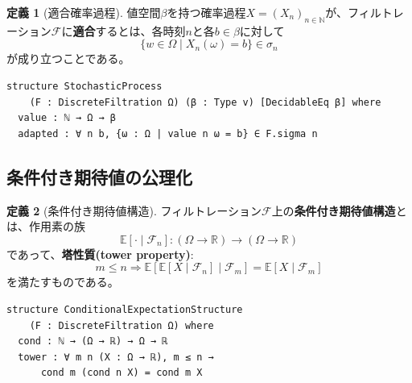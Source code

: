 \documentclass[a4paper,12pt]{ltjsarticle}
\theoremstyle{definition}
\newtheorem{definition}{定義}[section]
\begin{document}
\begin{definition}[適合確率過程]
値空間$\beta$を持つ確率過程$X = (X_n)_{n \in \mathbb{N}}$が、フィルトレーション$\mathcal{F}$に\textbf{適合}するとは、各時刻$n$と各$b \in \beta$に対して
\[
  \{w \in \Omega \mid X_n(\omega) = b\} \in \sigma_n
\]
が成り立つことである。
\end{definition}

\begin{leanbox}
\begin{verbatim}
structure StochasticProcess
    (F : DiscreteFiltration Ω) (β : Type v) [DecidableEq β] where
  value : ℕ → Ω → β
  adapted : ∀ n b, {ω : Ω | value n ω = b} ∈ F.sigma n
\end{verbatim}
\end{leanbox}

\subsection{条件付き期待値の公理化}

\begin{definition}[条件付き期待値構造]
フィルトレーション$\mathcal{F}$上の\textbf{条件付き期待値構造}とは、作用素の族
\[
  \mathbb{E}[\cdot \mid \mathcal{F}_n] : (\Omega \to \mathbb{R}) \to (\Omega \to \mathbb{R})
\]
であって、\textbf{塔性質(tower property)}:
\[
  m \leq n \Rightarrow \mathbb{E}[\mathbb{E}[X \mid \mathcal{F}_n] \mid \mathcal{F}_m] = \mathbb{E}[X \mid \mathcal{F}_m]
\]
を満たすものである。
\end{definition}

\begin{leanbox}
\begin{verbatim}
structure ConditionalExpectationStructure
    (F : DiscreteFiltration Ω) where
  cond : ℕ → (Ω → ℝ) → Ω → ℝ
  tower : ∀ m n (X : Ω → ℝ), m ≤ n →
      cond m (cond n X) = cond m X
\end{verbatim}
\end{leanbox}

\begin{center}
\end{center}
\end{document}
